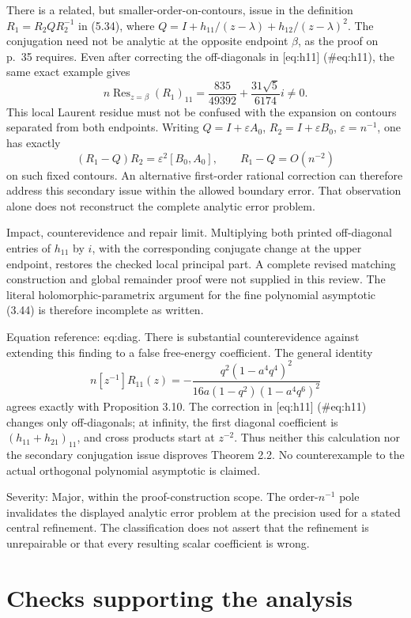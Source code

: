 \documentclass[10pt]{article}
\begin{document}
There is a related, but smaller-order-on-contours, issue in the definition \(R_1=R_2 Q R_2^{-1}\) in (5.34), where \(Q=I+h_{11}/(z-\lambda)+h_{12}/(z-\lambda)^2\). The conjugation need not be analytic at the opposite endpoint \(\beta\), as the proof on p. 35 requires. Even after correcting the off-diagonals in [eq:h11] (\#eq:h11), the same exact example gives \[n\operatorname{Res}_{z=\beta}(R_1)_{11}
 =\frac{835}{49392}+\frac{31\sqrt5}{6174}i\ne0 .\] This local Laurent residue must not be confused with the expansion on contours separated from both endpoints. Writing \(Q=I+\varepsilon A_0\), \(R_2=I+\varepsilon B_0\), \(\varepsilon=n^{-1}\), one has exactly \[(R_1-Q)R_2=\varepsilon^2[B_0,A_0],
 \qquad R_1-Q=O(n^{-2})\] on such fixed contours. An alternative first-order rational correction can therefore address this secondary issue within the allowed boundary error. That observation alone does not reconstruct the complete analytic error problem.\par
Impact, counterevidence and repair limit. Multiplying both printed off-diagonal entries of \(h_{11}\) by \(i\), with the corresponding conjugate change at the upper endpoint, restores the checked local principal part. A complete revised matching construction and global remainder proof were not supplied in this review. The literal holomorphic-parametrix argument for the fine polynomial asymptotic (3.44) is therefore incomplete as written.\par
Equation reference: eq:diag. There is substantial counterevidence against extending this finding to a false free-energy coefficient. The general identity \[
 n[z^{-1}]R_{11}(z)
 =-\frac{q^2(1-a^4q^4)^2}
 {16a(1-q^2)(1-a^4q^6)^2}\] agrees exactly with Proposition 3.10. The correction in [eq:h11] (\#eq:h11) changes only off-diagonals; at infinity, the first diagonal coefficient is \((h_{11}+h_{21})_{11}\), and cross products start at \(z^{-2}\). Thus neither this calculation nor the secondary conjugation issue disproves Theorem 2.2. No counterexample to the actual orthogonal polynomial asymptotic is claimed.\par
Severity: Major, within the proof-construction scope. The order-\(n^{-1}\) pole invalidates the displayed analytic error problem at the precision used for a stated central refinement. The classification does not assert that the refinement is unrepairable or that every resulting scalar coefficient is wrong.\par
\section*{Checks supporting the analysis}
\end{document}
